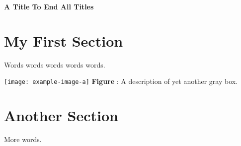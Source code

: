 \documentclass[12pt]{article}
\begin{document}
\clearpage
\singlespacing

\centerline{\textbf{A Title To End All Titles}}
\vspace*{0.2\baselineskip}
\section{My First Section}
Words words words words words.


\begin{imbox}[label=fig:myfigname]{}
\texttt{[image: example-image-a]}
\tcblower
\vspace{-12pt}
\textbf{Figure \thetcbcounter}: A description of yet another gray box.
\end{imbox}

\vspace*{-0.2\baselineskip}
\section{Another Section}
More words.


\end{document}
